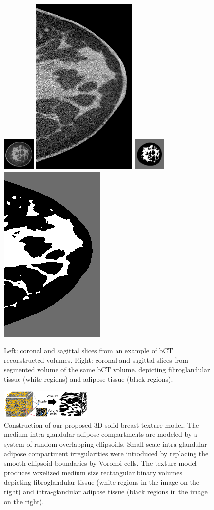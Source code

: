 \documentclass[journal]{IEEEtran}
\begin{document}
\begin{figure}[!htbp]
  \centering
  \includegraphics[width=0.145\textwidth]{gray-cor-small}%
  \includegraphics[height=0.145\textwidth]{gray-sag-small}%
  \hspace{2mm}%
  \includegraphics[width=0.145\textwidth]{seg-cor-small}%
  \includegraphics[height=0.145\textwidth]{seg-sag-small}

  \caption{Left: coronal and sagittal slices from an example of bCT
    reconstructed volumes. Right: coronal and sagittal slices from
    segmented volume of the same bCT volume, depicting fibroglandular
    tissue (white regions) and adipose tissue (black regions).}
  \label{fig:bct-ims}
\end{figure}

\begin{figure}[!htbp]
  \centering
  \includegraphics[width=0.4\textwidth]{model}
  \caption{Construction of our proposed 3D solid breast texture
    model. The medium intra-glandular adipose compartments are modeled
    by a system of random overlapping ellipsoids. Small scale
    intra-glandular adipose compartment irregularities were introduced
    by replacing the smooth ellipsoid boundaries by Voronoi cells. The
    texture model produces voxelized medium size rectangular binary
    volumes depicting fibroglandular tissue (white regions in the
    image on the right) and intra-glandular adipose tissue (black
    regions in the image on the right).}
  \label{fig:model}
\end{figure}
\end{document}
